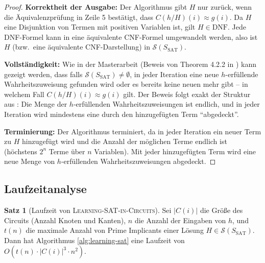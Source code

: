 ﻿\documentclass[a4paper,12pt]{article}
\theoremstyle{definition}
\newtheorem{satz}{Satz}
\begin{document}
\begin{proof}
    \textbf{Korrektheit der Ausgabe:} Der Algorithmus gibt $H$ nur zurück, wenn die Äquivalenzprüfung in Zeile 5 bestätigt, dass $C(h/H)(i) \approx g(i)$. Da $H$ eine Disjunktion von Termen mit positiven Variablen ist, gilt $H \in \text{DNF}$. Jede DNF-Formel kann in eine äquivalente CNF-Formel umgewandelt werden, also ist $H$ (bzw.\ eine äquivalente CNF-Darstellung) in $\mathcal{S}(S_{\text{SAT}})$.
    
    \textbf{Vollständigkeit:} Wie in der Masterarbeit (Beweis von Theorem 4.2.2 in \cite{Epp13}) kann gezeigt werden, dass falls $\mathcal{S}(S_{\text{SAT}}) \neq \emptyset$, in jeder Iteration eine neue $h$-erfüllende Wahrheitszuweisung gefunden wird oder es bereits keine neuen mehr gibt -- in welchem Fall $C(h/H)(i) \approx g(i)$ gilt. Der Beweis folgt exakt der Struktur aus \cite{Epp13}: Die Menge der $h$-erfüllenden Wahrheitszuweisungen ist endlich, und in jeder Iteration wird mindestens eine durch den hinzugefügten Term ``abgedeckt''.
    
    \textbf{Terminierung:} Der Algorithmus terminiert, da in jeder Iteration ein neuer Term zu $H$ hinzugefügt wird und die Anzahl der möglichen Terme endlich ist (höchstens $2^n$ Terme über $n$ Variablen). Mit jeder hinzugefügten Term wird eine neue Menge von $h$-erfüllenden Wahrheitszuweisungen abgedeckt.
\end{proof}

\subsection{Laufzeitanalyse}

\begin{satz}[Laufzeit von \textsc{Learning-SAT-in-Circuits}]
    Sei $|C(i)|$ die Größe des Circuits (Anzahl Knoten und Kanten), $n$ die Anzahl der Eingaben von $h$, und $t(n)$ die maximale Anzahl von Prime Implicants einer Lösung $H \in \mathcal{S}(S_{\text{SAT}})$. Dann hat Algorithmus \ref{alg:learning-sat} eine Laufzeit von $O(t(n) \cdot |C(i)|^3 \cdot n^2)$.
\end{satz}
\end{document}
